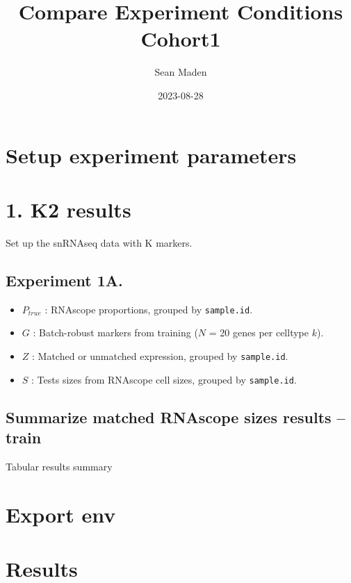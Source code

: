 \documentclass[
]{article}
\title{Compare Experiment Conditions Cohort1}
\author{Sean Maden}
\date{2023-08-28}
\providecommand{\tightlist}{%
  \setlength{\itemsep}{0pt}\setlength{\parskip}{0pt}}
\begin{document}
\maketitle

\hypertarget{setup-experiment-parameters}{%
\section{Setup experiment
parameters}\label{setup-experiment-parameters}}

\hypertarget{k2-results}{%
\section{1. K2 results}\label{k2-results}}

Set up the snRNAseq data with K markers.

\hypertarget{experiment-1a.}{%
\subsection{Experiment 1A.}\label{experiment-1a.}}

\begin{itemize}
\tightlist
\item
  \(P_{true}\) : RNAscope proportions, grouped by \texttt{sample.id}.
\item
  \(G\) : Batch-robust markers from training (\(N\) = 20 genes per
  celltype \(k\)).
\item
  \(Z\) : Matched or unmatched expression, grouped by
  \texttt{sample.id}.
\item
  \(S\) : Tests sizes from RNAscope cell sizes, grouped by
  \texttt{sample.id}.
\end{itemize}

\hypertarget{summarize-matched-rnascope-sizes-results-train}{%
\subsection{Summarize matched RNAscope sizes results --
train}\label{summarize-matched-rnascope-sizes-results-train}}

Tabular results summary

\hypertarget{export-env}{%
\section{Export env}\label{export-env}}

\hypertarget{results}{%
\section{Results}\label{results}}
\end{document}
